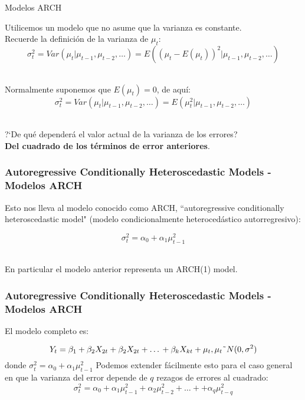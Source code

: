 \documentclass[xcolor=(list of options)]{beamer}
\begin{document}
\begin{section}{Modelos ARCH}
\begin{frame}
Utilicemos un modelo que no asume que la varianza es constante.\\

Recuerde la definici\'on de la varianza de $\mu_t$:\\

\begin{equation}
\sigma_t^2 = Var(\mu_t | \mu_{t-1},  \mu_{t-2}, \dots{}) = E((\mu_t -E(\mu_{t}))^2 | \mu_{t-1},  \mu_{t-2}, \dots{})
\end{equation}
 \vspace{4mm}	


Normalmente suponemos que $E(\mu_t) = 0$, de aqu\'{i}:
\begin{equation}
\sigma_t^2 = Var(\mu_t | \mu_{t-1},  \mu_{t-2}, \dots{}) = E(\mu_{t}^2 | \mu_{t-1},  \mu_{t-2}, \dots{})
\end{equation} 

?`De qu\'e depender\'a el valor actual de la varianza de los errores?\\

\textbf{Del cuadrado de los t\'erminos de error anteriores}.\\

\end{frame}

\begin{frame}
\frametitle{Autoregressive Conditionally Heteroscedastic Models - Modelos ARCH }

Esto nos lleva al modelo conocido como ARCH, ``autoregressive conditionally heteroscedastic model" (modelo condicionalmente heterocedástico autorregresivo):

\begin{equation}
\sigma_t^2 = \alpha_0 + \alpha_1 \mu^2_{t-1}
\end{equation} 

En particular el modelo anterior representa un ARCH(1) model.


\end{frame}

\begin{frame}
\frametitle{Autoregressive Conditionally Heteroscedastic Models - Modelos ARCH }

El modelo completo es:

\begin{equation}
Y_t = \beta_1 + \beta_2 X_{2t} + \beta_2 X_{2t} + \dots{} + \beta_k X_{kt} +\mu_t, \mu_t \string~N(0,\sigma^2)
\end{equation}
\vspace{2mm}	
donde $\sigma_t^2 = \alpha_0 + \alpha_1 \mu^2_{t-1}$
\vspace{2mm}	
Podemos extender f\'acilmente esto para el caso general en que la varianza del error depende de $q$ rezagos de errores al cuadrado:
\begin{equation}
\sigma_t^2 = \alpha_0 + \alpha_1 \mu^2_{t-1} + \alpha_2 \mu^2_{t-2} + \dots{} + + \alpha_q \mu^2_{t-q}
\end{equation} 


\end{frame}
\end{section}
\end{document}
